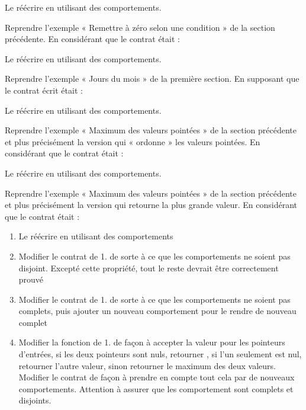 

Le réécrire en utilisant des comportements.




Reprendre l'exemple « Remettre à zéro selon une condition » de la section
précédente. En considérant que le contrat était :





Le réécrire en utilisant des comportements.



Reprendre l'exemple « Jours du mois » de la première section.
En supposant que le contrat écrit était :





Le réécrire en utilisant des comportements.




Reprendre l'exemple « Maximum des valeurs pointées » de la section
précédente et plus précisément la version qui « ordonne » les valeurs
pointées. En considérant que le contrat était :





Le réécrire en utilisant des comportements.





Reprendre l'exemple « Maximum des valeurs pointées » de la section
précédente et plus précisément la version qui retourne la plus grande
valeur. En considérant que le contrat était :




\begin{enumerate}
\item Le réécrire en utilisant des comportements
\item Modifier le contrat de 1. de sorte à ce que les comportements ne
  soient pas disjoint. Excepté cette propriété, tout le reste devrait
  être correctement prouvé
\item Modifier le contrat de 1. de sorte à ce que les comportements ne
  soient pas complets, puis ajouter un nouveau comportement pour le
  rendre de nouveau complet
\item Modifier la fonction de 1. de façon à accepter la valeur
   pour les pointeurs d'entrées, si les deux pointeurs
  sont nuls, retourner  , si l'un seulement est
  nul, retourner l'autre valeur, sinon retourner le maximum des deux
  valeurs. Modifier le contrat de façon à prendre en compte tout cela
  par de nouveaux comportements. Attention à assurer que les comportement
  sont complets et disjoints.
\end{enumerate}



